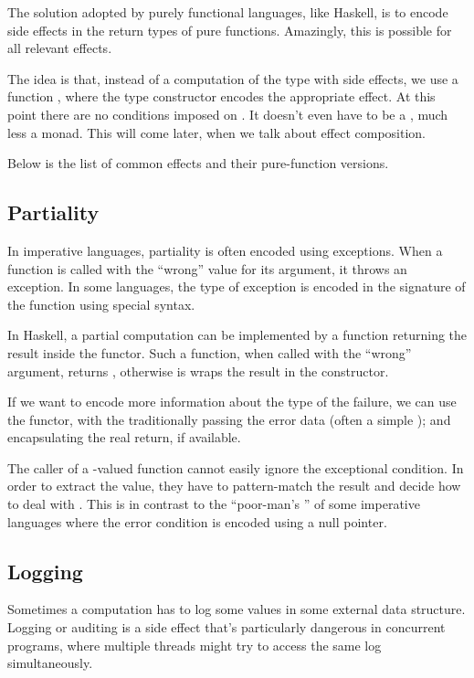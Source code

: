 \documentclass[DaoFP]{subfiles}
\begin{document}
The solution adopted by purely functional languages, like Haskell, is to encode side effects in the return types of pure functions. Amazingly, this is possible for all relevant effects. 

The idea is that, instead of a computation of the type  with side effects, we use a function , where the type constructor  encodes the appropriate effect. At this point there are no conditions imposed on . It doesn't even have to be a , much less a monad. This will come later, when we talk about effect composition.

Below is the list of common effects and their pure-function versions.

\subsection{Partiality}
In imperative languages, partiality is often encoded using exceptions. When a function is called with the ``wrong'' value for its argument, it throws an exception. In some languages, the type of exception is encoded in the signature of the function using special syntax. 

In Haskell, a partial computation can be implemented by a function returning the result inside the  functor. Such a function, when called with the ``wrong'' argument, returns , otherwise is wraps the result in the  constructor.

If we want to encode more information about the type of the failure, we can use the  functor, with the  traditionally passing the error data (often a simple ); and  encapsulating the real return, if available.

The caller of a -valued function cannot easily ignore the exceptional condition. In order to extract the value, they have to pattern-match the result and decide how to deal with . This is in contrast to the ``poor-man's '' of some imperative languages where the error condition is encoded using a null pointer.

\subsection{Logging}

Sometimes a computation has to log some values in some external data structure. Logging or auditing is a side effect that's particularly dangerous in concurrent programs, where multiple threads might try to access the same log simultaneously.
\end{document}
